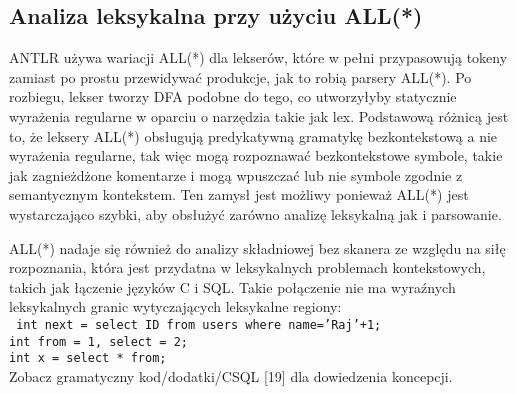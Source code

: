 ﻿\subsection{Analiza leksykalna przy użyciu ALL(*)}
ANTLR używa wariacji ALL(*) dla lekserów, które w pełni przypasowują tokeny
zamiast po prostu przewidywać produkcje, jak to robią parsery ALL(*).
Po rozbiegu, lekser tworzy DFA podobne do tego, co utworzyłyby statycznie
wyrażenia regularne w oparciu o narzędzia takie jak lex.
Podstawową różnicą jest to, że leksery ALL(*) obsługują predykatywną gramatykę
bezkontekstową a nie wyrażenia regularne, tak więc mogą rozpoznawać
bezkontekstowe symbole, takie jak zagnieżdżone komentarze i mogą wpuszczać
lub nie symbole zgodnie z semantycznym kontekstem. 
Ten zamysł jest możliwy ponieważ ALL(*) jest wystarczająco szybki, aby
obsłużyć zarówno analizę leksykalną jak i parsowanie.
\par
ALL(*) nadaje się również do analizy składniowej bez skanera ze względu na
siłę rozpoznania, która jest przydatna w leksykalnych problemach kontekstowych,
takich jak łączenie języków C i SQL.
Takie połączenie nie ma wyraźnych leksykalnych granic wytyczających leksykalne regiony: \\
 \texttt{
int next = select ID from users where name='Raj'+1; \\
int from = 1, select = 2; \\
int x = select * from; \\
}
Zobacz gramatyczny kod/dodatki/CSQL [19] dla dowiedzenia koncepcji. 
